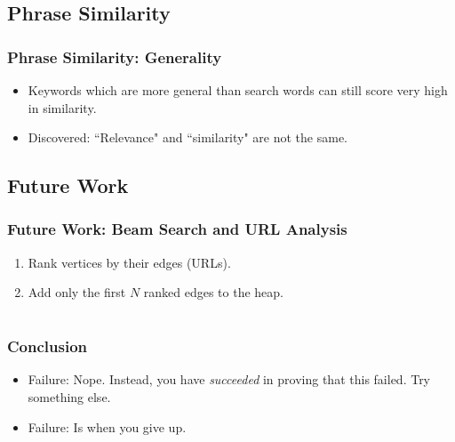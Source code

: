 \documentclass{beamer}
\begin{document}
\subsection{Phrase Similarity}
\begin{frame}
\frametitle{Phrase Similarity: Generality}
\begin{itemize}
\item Keywords which are more general than search words can still score very high in similarity.
\item Discovered: ``Relevance" and ``similarity" are not the same.
\end{itemize}
\end{frame}

\subsection{Future Work}
\begin{frame}
\frametitle{Future Work: Beam Search and URL Analysis}
\begin{enumerate}
\item Rank vertices by their edges (URLs).
\item Add only the first $ N $ ranked edges to the heap.
\end{enumerate}
\end{frame}

\section{}
\begin{frame}
\frametitle{Conclusion}
\begin{itemize}
\item Failure: Nope. Instead, you have \textit{succeeded} in proving that this failed. Try something else.
\item Failure: Is when you give up.
\end{itemize}
\end{frame}
\end{document}
